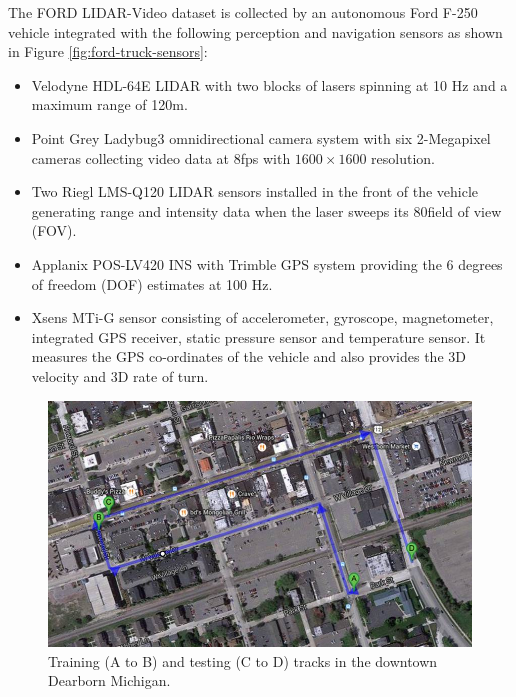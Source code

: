 \documentclass{article}
\begin{document}
The FORD LIDAR-Video dataset \cite{Pandey2011Ford-campu} is collected by an autonomous Ford F-250 vehicle integrated with the following perception and navigation sensors as shown in Figure \ref{fig:ford-truck-sensors}:
\begin{itemize}
    \item Velodyne HDL-64E LIDAR with two blocks of lasers spinning at 10 Hz and a maximum range of 120m.
    \item Point Grey Ladybug3 omnidirectional camera system with six 2-Megapixel cameras collecting video data at 8fps with $1600\times1600$ resolution.
    \item Two Riegl LMS-Q120 LIDAR sensors installed in the front of the vehicle generating range and intensity data when the laser sweeps its 80\degree field of view (FOV).
    \item Applanix POS-LV420 INS with Trimble GPS system providing the 6 degrees of freedom (DOF) estimates at 100 Hz.
    \item Xsens MTi-G sensor consisting of accelerometer, gyroscope, magnetometer, integrated GPS receiver, static pressure sensor and temperature sensor. It measures the GPS co-ordinates of the vehicle and also provides the 3D velocity and 3D rate of turn.
\end{itemize}


\begin{figure}[htbp]
    \centering
        \includegraphics[scale=0.35]{Figures/ford_train_test_track.jpg}
    \caption{Training (A to B) and testing (C to D) tracks in the downtown Dearborn Michigan.}
    \label{fig:ford_train_test_track}
\end{figure}
\end{document}

